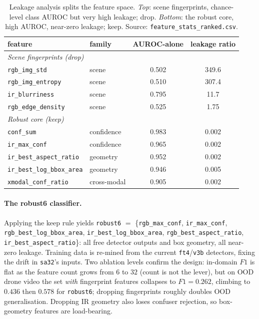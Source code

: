 \begin{table}[htbp]
    \centering
    \caption{Leakage analysis splits the feature space. \emph{Top}: scene fingerprints, chance-level class AUROC but very high leakage; drop. \emph{Bottom}: the robust core, high AUROC, near-zero leakage; keep. Source: \texttt{feature\_stats\_ranked.csv}.}
    \label{tab:leakage}
    \begin{tabular}{llcc}
        \toprule
        feature & family & AUROC-alone & leakage ratio \\
        \midrule
        \multicolumn{4}{l}{\emph{Scene fingerprints (drop)}} \\
        \texttt{rgb\_img\_std}       & scene       & 0.502 & 349.6 \\
        \texttt{rgb\_img\_entropy}   & scene       & 0.510 & 307.4 \\
        \texttt{ir\_blurriness}      & scene       & 0.795 & 11.7 \\
        \texttt{rgb\_edge\_density}  & scene       & 0.525 & 1.75 \\
        \midrule
        \multicolumn{4}{l}{\emph{Robust core (keep)}} \\
        \texttt{conf\_sum}             & confidence  & 0.983 & 0.002 \\
        \texttt{ir\_max\_conf}         & confidence  & 0.965 & 0.002 \\
        \texttt{ir\_best\_aspect\_ratio} & geometry  & 0.952 & 0.002 \\
        \texttt{ir\_best\_log\_bbox\_area} & geometry & 0.946 & 0.005 \\
        \texttt{xmodal\_conf\_ratio}   & cross-modal & 0.905 & 0.002 \\
        \bottomrule
    \end{tabular}
\end{table}

\paragraph{The robust6 classifier.}
Applying the keep rule yields \texttt{robust6} $=$ \{\texttt{rgb\_max\_conf}, \texttt{ir\_max\_conf}, \texttt{rgb\_best\_log\_bbox\_area}, \texttt{ir\_best\_log\_bbox\_area}, \texttt{rgb\_best\_aspect\_ratio}, \texttt{ir\_best\_aspect\_ratio}\}: all free detector outputs and box geometry, all near-zero leakage. Training data is re-mined from the current \texttt{ft4}/\texttt{v3b} detectors, fixing the drift in \texttt{sa32}'s inputs. Two ablation levels confirm the design: in-domain $F1$ is flat as the feature count grows from $6$ to $32$ (count is not the lever), but on OOD drone video the set \emph{with} fingerprint features collapses to $F1=0.262$, climbing to $0.436$ then $0.578$ for \texttt{robust6}; dropping fingerprints roughly doubles OOD generalisation. Dropping IR geometry also loses confuser rejection, so box-geometry features are load-bearing.

